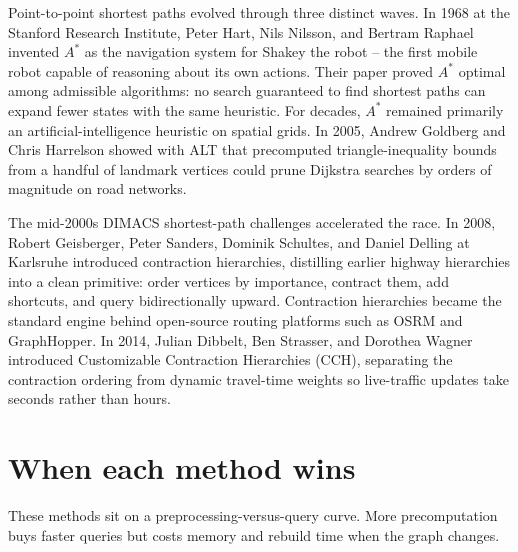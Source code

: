 \begin{historybox}
Point-to-point shortest paths evolved through three distinct waves. In 1968 at the Stanford
Research Institute, Peter Hart, Nils Nilsson, and Bertram Raphael invented $A^*$ as the
navigation system for Shakey the robot -- the first mobile robot capable of reasoning about
its own actions. Their paper proved $A^*$ optimal among admissible algorithms: no search
guaranteed to find shortest paths can expand fewer states with the same heuristic.
For decades, $A^*$ remained primarily an artificial-intelligence heuristic on spatial grids.
In 2005, Andrew Goldberg and Chris Harrelson showed with ALT that precomputed triangle-inequality
bounds from a handful of landmark vertices could prune Dijkstra searches by orders of magnitude on road networks.

The mid-2000s DIMACS shortest-path challenges accelerated the race. In 2008, Robert Geisberger,
Peter Sanders, Dominik Schultes, and Daniel Delling at Karlsruhe introduced contraction hierarchies,
distilling earlier highway hierarchies into a clean primitive: order vertices by importance,
contract them, add shortcuts, and query bidirectionally upward. Contraction hierarchies became
the standard engine behind open-source routing platforms such as OSRM and GraphHopper.
In 2014, Julian Dibbelt, Ben Strasser, and Dorothea Wagner introduced Customizable Contraction
Hierarchies (CCH), separating the contraction ordering from dynamic travel-time weights so
live-traffic updates take seconds rather than hours.
\end{historybox}

\section{When each method wins}
\label{ch08:tradeoffs}

These methods sit on a preprocessing-versus-query curve. More precomputation buys
faster queries but costs memory and rebuild time when the graph changes.

\begin{center}\small
\renewcommand{\arraystretch}{1.25}
\end{center}

